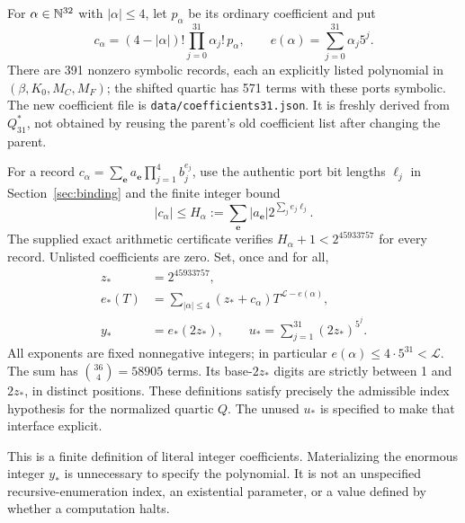 \documentclass[11pt]{article}
\theoremstyle{remark}\newtheorem{remark}[theorem]{Remark}
\begin{document}
For $\alpha\in\mathbb N^{32}$ with $|\alpha|\le4$, let $p_\alpha$ be its
ordinary coefficient and put
\[
 c_\alpha=(4-|\alpha|)!\prod_{j=0}^{31}\alpha_j!\,p_\alpha,
 \qquad e(\alpha)=\sum_{j=0}^{31}\alpha_j5^j.
\]
There are 391 nonzero symbolic records, each an explicitly listed polynomial
in $(\beta,K_0,M_C,M_F)$; the shifted quartic has 571 terms with these
ports symbolic. The new coefficient file is \texttt{data/coefficients31.json}.
It is freshly derived from $Q_{31}^{*}$, not obtained by reusing the parent's
old coefficient list after changing the parent.

For a record $c_\alpha=\sum_{\mathbf e} a_{\mathbf e}
\prod_{j=1}^{4}b_j^{e_j}$, use the authentic port bit lengths $\ell_j$
in Section~\ref{sec:binding} and the finite integer bound
\[
 |c_\alpha|\le H_\alpha:=
 \sum_{\mathbf e}|a_{\mathbf e}|2^{\sum_j e_j\ell_j}.
\]
The supplied exact arithmetic certificate verifies
$H_\alpha+1<2^{45933757}$ for every record. Unlisted coefficients are zero.
Set, once and for all,
\begin{align*}
 z_*&=2^{45933757},\\
 e_*(T)&=\sum_{|\alpha|\le4}(z_*+c_\alpha)
                T^{\mathcal L-e(\alpha)},\\
 y_*&=e_*(2z_*),\qquad
 u_* =\sum_{j=1}^{31}(2z_*)^{5^j}.
\end{align*}
All exponents are fixed nonnegative integers; in particular
$e(\alpha)\le4\cdot5^{31}<\mathcal L$.
The sum has $\binom{36}{4}=58905$ terms. Its base-$2z_*$ digits are
strictly between 1 and $2z_*$, in distinct positions. These definitions
satisfy precisely the admissible index hypothesis for the normalized
quartic $Q$. The unused $u_*$ is specified to make that interface explicit.

This is a finite definition of literal integer coefficients. Materializing
the enormous integer $y_*$ is unnecessary to specify the polynomial. It is
not an unspecified recursive-enumeration index, an existential parameter,
or a value defined by whether a computation halts.
\end{document}

